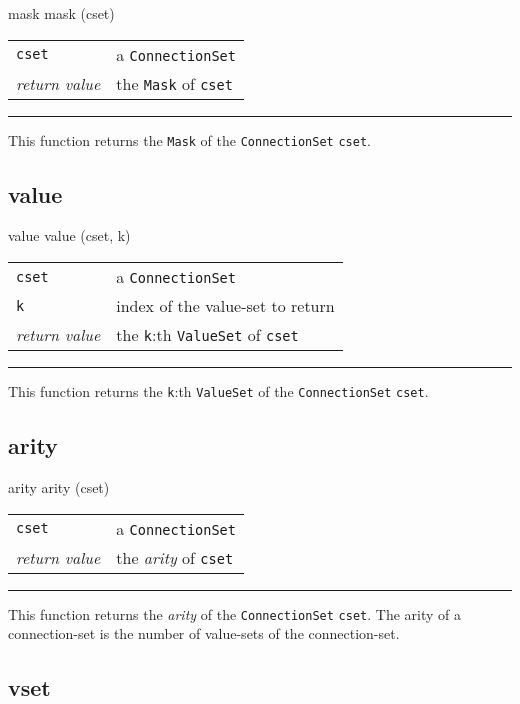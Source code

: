 \documentclass[a4paper,twoside]{report}
\makeatletter
\newenvironment{parameters}%
{\begin{tabular}{@{\hspace{2em}}lp{0.6\textwidth}}}%
{\end{tabular}\par\vspace{1mm}\par\hrule\par\vspace{5mm}}
\makeatother
\begin{document}
\begin{head}{mask}
  mask (cset)
\end{head}
\begin{parameters}
  \lstinline|cset| &%
  a \lstinline|ConnectionSet|\\
  \emph{return value} &%
  the \lstinline|Mask| of \lstinline|cset|\\
\end{parameters}
This function returns the \lstinline|Mask| of the
\lstinline|ConnectionSet| \lstinline|cset|.

\subsection{value}

\begin{head}{value}
  value (cset, k)
\end{head}
\begin{parameters}
  \lstinline|cset| &%
  a \lstinline|ConnectionSet|\\
  \lstinline|k| &%
  index of the value-set to return\\
  \emph{return value} &%
  the \lstinline|k|:th \lstinline|ValueSet| of \lstinline|cset|\\
\end{parameters}
This function returns the \lstinline|k|:th \lstinline|ValueSet| of the
\lstinline|ConnectionSet| \lstinline|cset|.

\subsection{arity}

\begin{head}{arity}
  arity (cset)
\end{head}
\begin{parameters}
  \lstinline|cset| &%
  a \lstinline|ConnectionSet|\\
  \emph{return value} &%
  the \emph{arity} of \lstinline|cset|\\
\end{parameters}
This function returns the \emph{arity} of the
\lstinline|ConnectionSet| \lstinline|cset|.  The arity of a
connection-set is the number of value-sets of the connection-set.

\subsection{vset}
\end{document}
